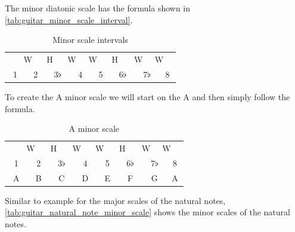 The minor diatonic scale has the formula shown in \autoref{tab:guitar_minor_scale_interval}.

\begin{table}[h]
	\centering
	\begin{tabular}{*{16}{c}}
		& \multicolumn{2}{P{4mm}}{\large{W}} & \multicolumn{2}{P{4mm}}{\large{H}} & \multicolumn{2}{P{4mm}}{\large{W}} & \multicolumn{2}{P{4mm}}{\large{W}} & \multicolumn{2}{P{4mm}}{\large{H}} & \multicolumn{2}{P{4mm}}{\large{W}} & \multicolumn{2}{P{4mm}}{\large{W}} & \\
		\multicolumn{2}{P{4mm}}{1} & \multicolumn{2}{P{4mm}}{2} & \multicolumn{2}{P{4mm}}{3$\flat$} & \multicolumn{2}{P{4mm}}{4} & \multicolumn{2}{P{4mm}}{5} & \multicolumn{2}{P{4mm}}{6$\flat$} & \multicolumn{2}{P{4mm}}{7$\flat$} & \multicolumn{2}{P{4mm}}{8}
	\end{tabular}
	\caption{Minor scale intervals}
	\label{tab:guitar_minor_scale_interval}
\end{table}

To create the A minor scale we will start on the A and then simply follow the formula.

\begin{table}[h]
	\centering
	\begin{tabular}{*{16}{c}}
		& \multicolumn{2}{P{4mm}}{\large{W}} & \multicolumn{2}{P{4mm}}{\large{H}} & \multicolumn{2}{P{4mm}}{\large{W}} & \multicolumn{2}{P{4mm}}{\large{W}} & \multicolumn{2}{P{4mm}}{\large{H}} & \multicolumn{2}{P{4mm}}{\large{W}} & \multicolumn{2}{P{4mm}}{\large{W}} & \\
		\multicolumn{2}{P{4mm}}{1} & \multicolumn{2}{P{4mm}}{2} & \multicolumn{2}{P{4mm}}{3$\flat$} & \multicolumn{2}{P{4mm}}{4} & \multicolumn{2}{P{4mm}}{5} & \multicolumn{2}{P{4mm}}{6$\flat$} & \multicolumn{2}{P{4mm}}{7$\flat$} & \multicolumn{2}{P{4mm}}{8} \\
		\multicolumn{2}{P{4mm}}{A} & \multicolumn{2}{P{4mm}}{B} & \multicolumn{2}{P{4mm}}{C} & \multicolumn{2}{P{4mm}}{D} & \multicolumn{2}{P{4mm}}{E} & \multicolumn{2}{P{4mm}}{F} & \multicolumn{2}{P{4mm}}{G} & \multicolumn{2}{P{4mm}}{A}
	\end{tabular}
	\caption{A minor scale}
	\label{tab:guitar_a_minor_scale}
\end{table}

Similar to example for the major scales of the natural notes, \autoref{tab:guitar_natural_note_minor_scale} shows the minor scales of the natural notes.

